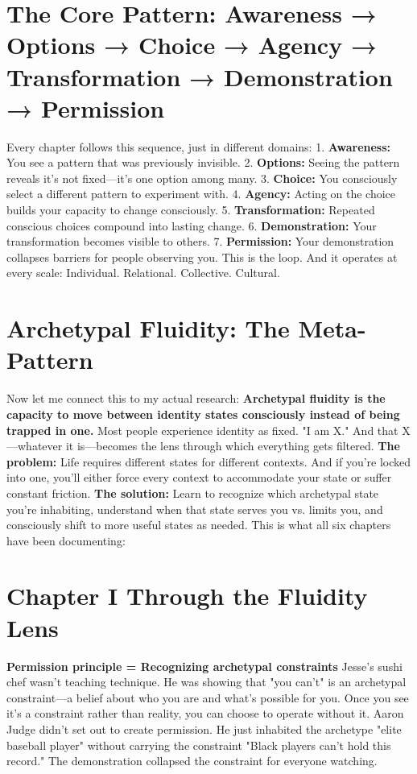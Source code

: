 \documentclass[12pt,openany]{book}
\begin{document}
\section{The Core Pattern: Awareness → Options → Choice → Agency → Transformation → Demonstration → Permission}

Every chapter follows this sequence, just in different domains:
1. \textbf{Awareness:} You see a pattern that was previously invisible.
2. \textbf{Options:} Seeing the pattern reveals it's not fixed—it's one option among many.
3. \textbf{Choice:} You consciously select a different pattern to experiment with.
4. \textbf{Agency:} Acting on the choice builds your capacity to change consciously.
5. \textbf{Transformation:} Repeated conscious choices compound into lasting change.
6. \textbf{Demonstration:} Your transformation becomes visible to others.
7. \textbf{Permission:} Your demonstration collapses barriers for people observing you.
This is the loop. And it operates at every scale:
Individual. Relational. Collective. Cultural.

\section{Archetypal Fluidity: The Meta-Pattern}

Now let me connect this to my actual research:
\textbf{Archetypal fluidity is the capacity to move between identity states consciously instead of being trapped in one.}
Most people experience identity as fixed. "I am X." And that X—whatever it is—becomes the lens through which everything gets filtered.
\textbf{The problem:} Life requires different states for different contexts. And if you're locked into one, you'll either force every context to accommodate your state or suffer constant friction.
\textbf{The solution:} Learn to recognize which archetypal state you're inhabiting, understand when that state serves you vs. limits you, and consciously shift to more useful states as needed.
This is what all six chapters have been documenting:

\section{Chapter I Through the Fluidity Lens}

\textbf{Permission principle = Recognizing archetypal constraints}
Jesse's sushi chef wasn't teaching technique. He was showing that "you can't" is an archetypal constraint—a belief about who you are and what's possible for you.
Once you see it's a constraint rather than reality, you can choose to operate without it.
Aaron Judge didn't set out to create permission. He just inhabited the archetype "elite baseball player" without carrying the constraint "Black players can't hold this record."
The demonstration collapsed the constraint for everyone watching.
\end{document}
